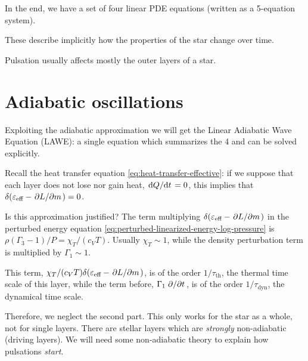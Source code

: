 \documentclass[main.tex]{subfiles}
\begin{document}
In the end, we have a set of four linear PDE equations (written as a 5-equation system).

These describe implicitly how the properties of the star change over time.

Pulsation usually affects mostly the outer layers of a star.


\section{Adiabatic oscillations}

Exploiting the adiabatic approximation we will get the  Linear Adiabatic Wave Equation (LAWE): a single equation which summarizes the 4 and can be solved explicitly.

Recall the heat transfer equation \eqref{eq:heat-transfer-effective}: 
if we suppose that each layer does not lose nor gain heat, \(\dv*{Q}{t} =0\), this implies that \(\delta (\varepsilon_{\text{eff}} - \pdv*{L}{m} )=0\).

Is this approximation justified? The term multiplying \(\delta (\varepsilon_{\text{eff}} - \pdv*{L}{m} )\) in the perturbed energy equation \eqref{eq:perturbed-linearized-energy-log-pressure} is \(\rho (\Gamma_3-1)/P  = \chi_T / (c_V T)\).
Usually \(\chi_T \sim 1\), while the density perturbation term is multiplied by \(\Gamma_1 \sim 1\).

This term,  \( \chi_T / (c_V T) \delta (\varepsilon_{\text{eff}} - \pdv*{L}{m} )\), is of the order \(1/\tau_{\text{th}}\), the thermal time scale of this layer, while the term before, \(\Gamma_1 \pdv*{}{t} (\delta \rho / \rho)\), is of the order \(1/\tau_{\text{dyn}}\), the dynamical time scale.


Therefore, we neglect the second part.
This only works for the star as a whole, not for single layers.
There are stellar layers which are \emph{strongly} non-adiabatic (driving layers). We will need some non-adiabatic theory to explain how pulsations \emph{start}.
\end{document}
